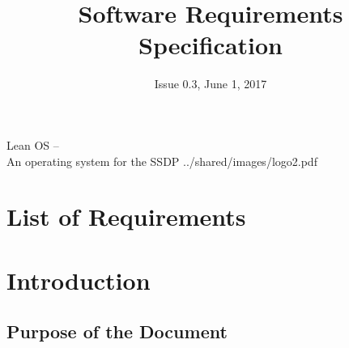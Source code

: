 

\title{Software Requirements Specification}
\def \documentid {LEANOS-UVIE-SRS-001}
\date{Issue 0.3, June 1, 2017}

\newcommand\affil[1]{\textsuperscript#1}

\def\preparedby {Armin Luntzer\affil{1}}
\def\checkedby {Roland Ottensamer\affil{1}}
\def\approvedby {Franz Kerschbaum\affil{1}}

\def\affiliations{
	\affil{1} Department of Astrophysics, University of Vienna
}









\usepackage{vhistory}

\usepackage{biblatex}


\rereadauxrequirementlabels

\exportrequirements





\setmainfont{MyriadPro-SemiCondensed}
\uvietitlepage%
{Lean OS --\\ An operating system for the SSDP}%
{\doctitle}%
{../shared/images/logo2.pdf}
\setmainfont{MyriadPro}

\approvalpage

\tableofcontents
\newpage


\chapter*{List of Requirements}
\the\requirementlist


\begin{versionhistory}
\end{versionhistory}


\chapter{Introduction}

\section{Purpose of the Document}

